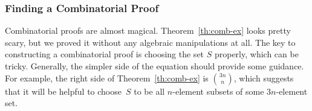 \subsubsection{Finding a Combinatorial Proof}

Combinatorial proofs are almost magical.  Theorem~\ref{th:comb-ex}
looks pretty scary, but we proved it without any algebraic
manipulations at all.  The key to constructing a combinatorial proof
is choosing the set $S$ properly, which can be tricky.  Generally, the
simpler side of the equation should provide some guidance.  For
example, the right side of Theorem~\ref{th:comb-ex} is
$\binom{3n}{n}$, which suggests that it will be helpful to choose~$S$
to be all $n$-element subsets of some $3n$-element set.

\begin{problems}
\classproblems
{}


\homeworkproblems
{}

\end{problems}


\endinput
